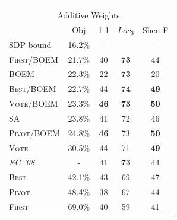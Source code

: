 \documentclass[11pt]{article}
\newcommand{\alg}[1]{\textsc{#1}}
\begin{document}
\begin{table}[th!]
\begin{tabular}{l|cccc}
\multicolumn{5}{c}{}\\
\multicolumn{5}{c}{Additive Weights}
\\ \hline
 & Obj & 1-1 & $Loc_3$ & Shen F
\\ \hline
SDP bound & 16.2\% & - & - & -
\\ \hline
\alg{First}/\alg{BOEM} & 21.7\% & 40 & {\bf 73} & 44
\\ 
\alg{BOEM} & 22.3\% & 22 & {\bf 73} & 20
\\ 
\alg{Best}/\alg{BOEM} & 22.7\% & 44 & {\bf 74} & {\bf 49}
\\ 
\alg{Vote}/\alg{BOEM} & 23.3\% & {\bf 46} & {\bf 73} & {\bf 50}
\\ 
SA & 23.8\% & 41 & 72 & 46
\\ 
\alg{Pivot}/\alg{BOEM} & 24.8\% & {\bf 46} & 73 & {\bf 50}
\\ 
\alg{Vote} & 30.5\% & 44 & 71 & {\bf 49}
\\ 
{\em EC '08} & - & 41 & {\bf 73} & 44
\\
\alg{Best} & 42.1\% & 43 & 69 & 47
\\ 
\alg{Pivot} & 48.4\% & 38 & 67 & 44
\\ 
\alg{First} & 69.0\% & 40 & 59 & 41




\end{tabular}
\end{table}
\end{document}
